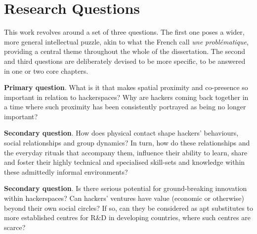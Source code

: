 \section{Research Questions}

This work revolves around a set of three questions. The first one poses a wider, more general intellectual puzzle, akin to what the French call \textit{une probl\'{e}matique}, providing a central theme throughout the whole of the dissertation. The second and third questions are deliberately devised to be more specific, to be answered in one or two core chapters.

\begin{list}{}{\leftmargin=0em}
\item[] \textbf{Primary question}. What is it that makes spatial proximity and co-presence so important in relation to hackerspaces? Why are hackers coming back together in a time where such proximity has been consistently portrayed as being no longer important?
\item[] \textbf{Secondary question}. How does physical contact shape hackers' behaviours, social relationships and group dynamics? In turn, how do these relationships and the everyday rituals that accompany them, influence their ability to learn, share and foster their highly technical and specialised skill-sets and knowledge within these admittedly informal environments?
\item[] \textbf{Secondary question}. Is there serious potential for ground-breaking innovation within hackerspaces? Can hackers' ventures have value (economic or otherwise) beyond their own social circles? If so, can they be considered as apt substitutes to more established centres for R\&D in developing countries, where such centres are scarce?
\end{list}